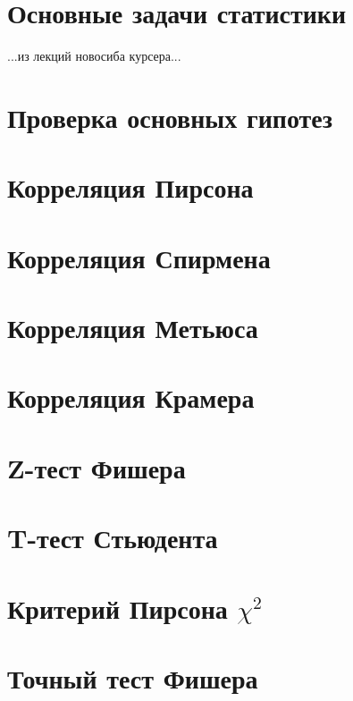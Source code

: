 \section{Основные задачи статистики}

...из лекций новосиба курсера...


\section{Проверка основных гипотез}


\section{Корреляция Пирсона}


\section{Корреляция Спирмена}


\section{Корреляция Метьюса}


\section{Корреляция Крамера}


\section{Z-тест Фишера}


\section{T-тест Стьюдента}


\section{Критерий Пирсона $\chi^2$}


\section{Точный тест Фишера}



